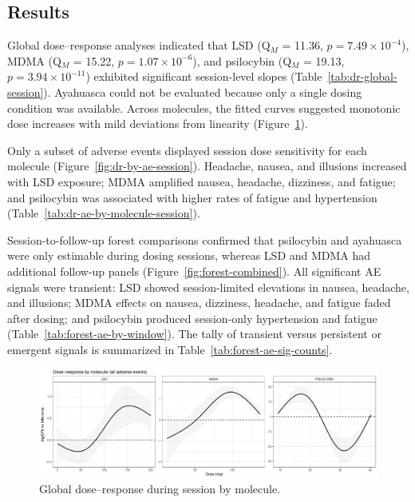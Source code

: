 \subsection{Results}

Global dose--response analyses indicated that LSD (Q$_M$ = 11.36, $p = 7.49\times10^{-4}$), MDMA (Q$_M$ = 15.22, $p = 1.07\times10^{-6}$), and psilocybin (Q$_M$ = 19.13, $p = 3.94\times10^{-11}$) exhibited significant session-level slopes (Table~\ref{tab:dr-global-session}). Ayahuasca could not be evaluated because only a single dosing condition was available. Across molecules, the fitted curves suggested monotonic dose increases with mild deviations from linearity (Figure~\ref{fig:dr-global-session}).

Only a subset of adverse events displayed session dose sensitivity for each molecule (Figure~\ref{fig:dr-by-ae-session}). Headache, nausea, and illusions increased with LSD exposure; MDMA amplified nausea, headache, dizziness, and fatigue; and psilocybin was associated with higher rates of fatigue and hypertension (Table~\ref{tab:dr-ae-by-molecule-session}).

Session-to-follow-up forest comparisons confirmed that psilocybin and ayahuasca were only estimable during dosing sessions, whereas LSD and MDMA had additional follow-up panels (Figure~\ref{fig:forest-combined}). All significant AE signals were transient: LSD showed session-limited elevations in nausea, headache, and illusions; MDMA effects on nausea, dizziness, headache, and fatigue faded after dosing; and psilocybin produced session-only hypertension and fatigue (Table~\ref{tab:forest-ae-by-window}). The tally of transient versus persistent or emergent signals is summarized in Table~\ref{tab:forest-ae-sig-counts}.

\begin{figure}[htb]
  \centering
  \includegraphics[width=\textwidth]{figures/master_dr_by_molecule-session.pdf}
  \caption{Global dose--response during session by molecule.}
  \label{fig:dr-global-session}
\end{figure}

